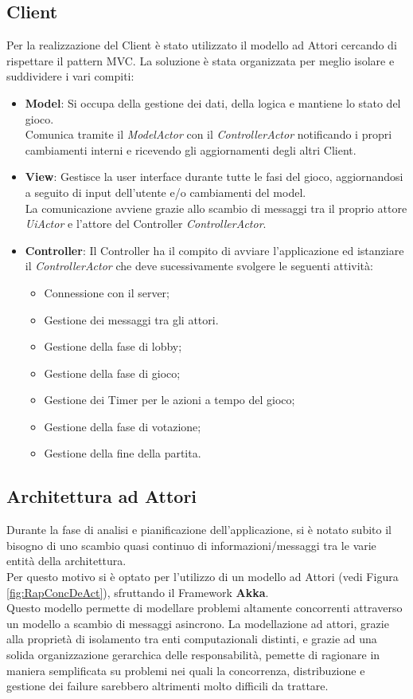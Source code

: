 \subsection{Client}
Per la realizzazione del Client è stato utilizzato il modello ad Attori cercando di rispettare il pattern MVC. La soluzione \`e stata organizzata per meglio isolare e suddividere i vari compiti:
\begin{itemize}
    \item \textbf{Model}: Si occupa della gestione dei dati, della logica e mantiene lo stato del gioco.\\
    Comunica tramite il \textit{ModelActor} con il \textit{ControllerActor} notificando i propri cambiamenti interni e ricevendo gli aggiornamenti degli altri Client.
    \item \textbf{View}: Gestisce la user interface durante tutte le fasi del gioco, aggiornandosi a seguito di input dell'utente e/o cambiamenti del model.\\
    La comunicazione avviene grazie allo scambio di messaggi tra il proprio attore \textit{UiActor} e l'attore del Controller \textit{ControllerActor}.
    \item \textbf{Controller}: Il Controller ha il compito di avviare l'applicazione ed istanziare il \textit{ControllerActor} che deve sucessivamente svolgere le seguenti attività:
    \begin{itemize}
        \item Connessione con il server;
        \item Gestione dei messaggi tra gli attori.
        \item Gestione della fase di lobby;
        \item Gestione della fase di gioco;
        \item Gestione dei Timer per le azioni a tempo del gioco;
        \item Gestione della fase di votazione;
        \item Gestione della fine della partita.
    \end{itemize}
\end{itemize}

\subsection{Architettura ad Attori}
Durante la fase di analisi e pianificazione dell'applicazione, si \`e notato subito il bisogno di uno scambio quasi continuo di informazioni/messaggi tra le varie entit\`a della architettura.\\
Per questo motivo si \`e optato per l'utilizzo di un modello ad Attori (vedi Figura \ref{fig:RapConcDeAct}), sfruttando il Framework \textbf{Akka}.\\
Questo modello permette di modellare problemi altamente concorrenti attraverso un modello a scambio di messaggi asincrono. La modellazione ad attori, grazie alla proprietà di isolamento tra enti computazionali distinti, e grazie ad una solida organizzazione gerarchica delle responsabilità, pemette di ragionare in maniera semplificata su problemi nei quali la concorrenza, distribuzione e gestione dei failure sarebbero altrimenti molto difficili da trattare.\\

